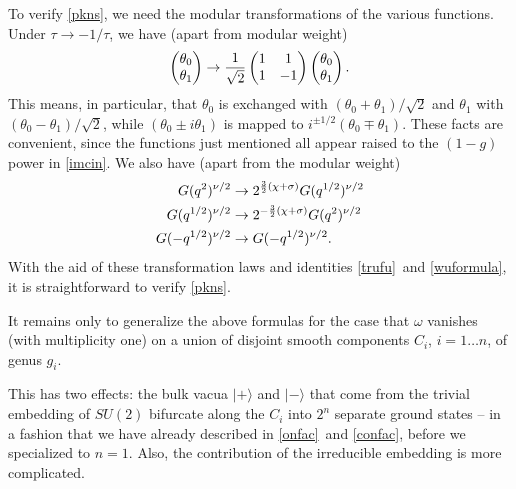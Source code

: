 \documentclass[12pt]{article}
\numberwithin{equation}{section}
\begin{document}
To verify \eqref{pkns},
we need the modular transformations of the various functions.
Under $\tau\to -1/\tau$, we have (apart from modular weight)
%
\begin{equation}
  \label{gipper}
  \begin{pmatrix} \theta_0\\ \theta_1\\
  \end{pmatrix}\to {1\over \sqrt 2}
  \begin{pmatrix} 1 & 1 \\ 1 & -1 \\
  \end{pmatrix}
  \begin{pmatrix}\theta_0 \\\theta_1\\
  \end{pmatrix}.
\end{equation}
This means, in particular, that $\theta_0$ is exchanged with
$(\theta_0+\theta_1)/\sqrt 2$ and $\theta_1$ with $(\theta_0-\theta_1)/\sqrt
2$,
while $(\theta_0\pm i \theta_1)$ is mapped to $i^{\pm 1/2}(\theta_0\mp
\theta_1)$.
These facts are convenient, since the functions just mentioned all appear
raised to the $(1-g)$ power in \eqref{imcin}.
We also have (apart from the modular weight)
%
\begin{equation}
  \label{ippper}
  \begin{aligned}G(q^2)^{\nu/2} & \to 2^{{3\over 2}(\chi+\sigma)}
    G(q^{1/2})^{\nu/2} \\ G(q^{1/2})^{\nu/2}&\to  2^{-{3\over
    2}(\chi+\sigma)} G(q^{2})^{\nu/2} \\ G(-q^{1/2})^{\nu/2} & \to
    G(-q^{1/2})^{\nu/2}.\\
  \end{aligned}
\end{equation}
%
With the aid of these transformation laws and identities \eqref{trufu}\ and
\eqref{wuformula}, it is straightforward to verify \eqref{pkns}.

\bigskip
{}

It remains only to generalize the above formulas for the case
that $\omega$ vanishes (with multiplicity one) on
a union of disjoint smooth components
$C_i$, $i=1\dots n$, of genus $g_i$.

This has two effects: the bulk vacua $|+\rangle$ and $|-\rangle$  that
come from the trivial embedding of $SU(2)$
bifurcate along the $C_i$ into $2^n$ separate ground states --
in a fashion that we have already described in \eqref{onfac}\ and
\eqref{confac},
before we specialized to $n=1$.
Also, the contribution of the irreducible embedding is more complicated.
\end{document}
